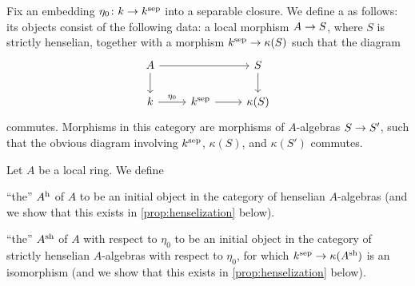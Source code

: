 Fix an embedding $\eta_0\colon k\morphism k^\sep$ into a separable closure. We define a  as follows: its objects consist of the following data: a local morphism $A\morphism S$, where $S$ is strictly henselian, together with a morphism $k^\sep\morphism \kappa(S)$ such that the diagram
\begin{equation*}
	\begin{tikzcd}
		A\dar \ar[rr] & & S\dar\\
		k \rar["\eta_0"]&k^\sep\rar & \kappa(S)
	\end{tikzcd}
\end{equation*}
commutes. Morphisms in this category are morphisms of $A$-algebras $S\morphism S'$, such that the obvious diagram involving $k^{\mathrm{sep}}$, $\kappa(S)$, and $\kappa(S')$ commutes.
\begin{defi}\label{def:henselization}
	Let $A$ be a local ring. We define
	\begin{alphanumerate}
		\item \enquote{the}  $A^{\mathrm{h}}$ of $A$ to be an initial object in the category of henselian $A$-algebras (and we show that this exists in \cref{prop:henselization} below).
		\item \enquote{the}  $A^{\mathrm{sh}}$ of $A$ with respect to $\eta_0$ to be an initial object in the category of strictly henselian $A$-algebras with respect to $\eta_0$, for which $k^\sep\morphism \kappa(A^\sh)$ is an isomorphism (and we show that this exists in \cref{prop:henselization} below).
	\end{alphanumerate}
\end{defi}
